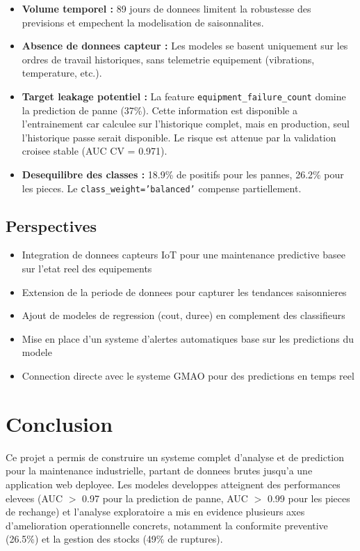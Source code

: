 \documentclass[12pt,a4paper]{article}
\begin{document}
\begin{itemize}
  \item \textbf{Volume temporel :} 89 jours de donnees limitent la robustesse des previsions et empechent la modelisation de saisonnalites.
  \item \textbf{Absence de donnees capteur :} Les modeles se basent uniquement sur les ordres de travail historiques, sans telemetrie equipement (vibrations, temperature, etc.).
  \item \textbf{Target leakage potentiel :} La feature \texttt{equipment\_failure\_count} domine la prediction de panne (37\%). Cette information est disponible a l'entrainement car calculee sur l'historique complet, mais en production, seul l'historique passe serait disponible. Le risque est attenue par la validation croisee stable (AUC CV = 0.971).
  \item \textbf{Desequilibre des classes :} 18.9\% de positifs pour les pannes, 26.2\% pour les pieces. Le \texttt{class\_weight='balanced'} compense partiellement.
\end{itemize}

\subsection{Perspectives}

\begin{itemize}
  \item Integration de donnees capteurs IoT pour une maintenance predictive basee sur l'etat reel des equipements
  \item Extension de la periode de donnees pour capturer les tendances saisonnieres
  \item Ajout de modeles de regression (cout, duree) en complement des classifieurs
  \item Mise en place d'un systeme d'alertes automatiques base sur les predictions du modele
  \item Connection directe avec le systeme GMAO pour des predictions en temps reel
\end{itemize}

\section{Conclusion}

Ce projet a permis de construire un systeme complet d'analyse et de prediction pour la maintenance industrielle, partant de donnees brutes jusqu'a une application web deployee. Les modeles developpes atteignent des performances elevees (AUC $>$ 0.97 pour la prediction de panne, AUC $>$ 0.99 pour les pieces de rechange) et l'analyse exploratoire a mis en evidence plusieurs axes d'amelioration operationnelle concrets, notamment la conformite preventive (26.5\%) et la gestion des stocks (49\% de ruptures).
\end{document}
